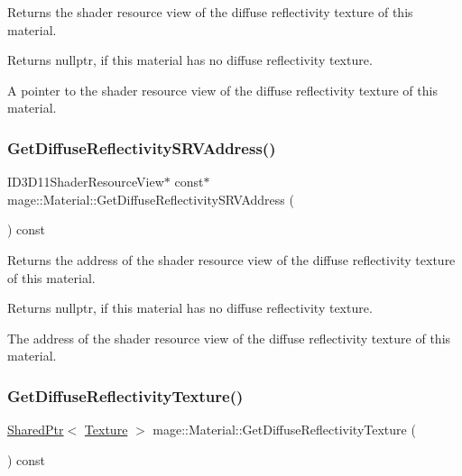 Returns the shader resource view of the diffuse reflectivity texture of this material.

\begin{DoxyReturn}{Returns}
{\ttfamily nullptr}, if this material has no diffuse reflectivity texture. 

A pointer to the shader resource view of the diffuse reflectivity texture of this material. 
\end{DoxyReturn}
\hypertarget{structmage_1_1_material_a655a7349f6023b81e8d396abe06ed6ac}{}\label{structmage_1_1_material_a655a7349f6023b81e8d396abe06ed6ac} 
\subsubsection{\texorpdfstring{Get\+Diffuse\+Reflectivity\+S\+R\+V\+Address()}{GetDiffuseReflectivitySRVAddress()}}
{\footnotesize\ttfamily I\+D3\+D11\+Shader\+Resource\+View$\ast$ const$\ast$ mage\+::\+Material\+::\+Get\+Diffuse\+Reflectivity\+S\+R\+V\+Address (\begin{DoxyParamCaption}{ }\end{DoxyParamCaption}) const\hspace{0.3cm}{\ttfamily [noexcept]}}

Returns the address of the shader resource view of the diffuse reflectivity texture of this material.

\begin{DoxyReturn}{Returns}
{\ttfamily nullptr}, if this material has no diffuse reflectivity texture. 

The address of the shader resource view of the diffuse reflectivity texture of this material. 
\end{DoxyReturn}
\hypertarget{structmage_1_1_material_a3b4de7dc988c91eb3ce7ea715d98b758}{}\label{structmage_1_1_material_a3b4de7dc988c91eb3ce7ea715d98b758} 
\subsubsection{\texorpdfstring{Get\+Diffuse\+Reflectivity\+Texture()}{GetDiffuseReflectivityTexture()}}
{\footnotesize\ttfamily \hyperlink{namespacemage_a1e01ae66713838a7a67d30e44c67703e}{Shared\+Ptr}$<$ \hyperlink{classmage_1_1_texture}{Texture} $>$ mage\+::\+Material\+::\+Get\+Diffuse\+Reflectivity\+Texture (\begin{DoxyParamCaption}{ }\end{DoxyParamCaption}) const\hspace{0.3cm}{\ttfamily [noexcept]}}

